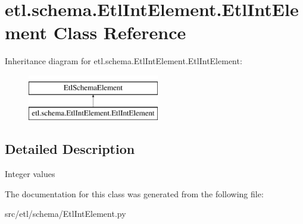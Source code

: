 \hypertarget{classetl_1_1schema_1_1EtlIntElement_1_1EtlIntElement}{\section{etl.\-schema.\-Etl\-Int\-Element.\-Etl\-Int\-Element Class Reference}
\label{classetl_1_1schema_1_1EtlIntElement_1_1EtlIntElement}
}
Inheritance diagram for etl.\-schema.\-Etl\-Int\-Element.\-Etl\-Int\-Element\-:\begin{figure}[H]
\begin{center}
\leavevmode
\includegraphics[height=2.000000cm]{classetl_1_1schema_1_1EtlIntElement_1_1EtlIntElement}
\end{center}
\end{figure}


\subsection{Detailed Description}
\begin{DoxyVerb}Integer values\end{DoxyVerb}
 

The documentation for this class was generated from the following file\-:\begin{DoxyCompactItemize}
\item 
src/etl/schema/Etl\-Int\-Element.\-py\end{DoxyCompactItemize}
